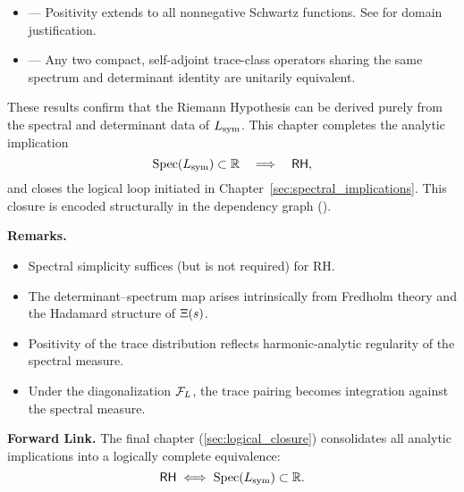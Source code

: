 \begin{itemize}
  \item {} — Positivity extends to all nonnegative Schwartz functions. See  for domain justification.

  \item {} — Any two compact, self-adjoint trace-class operators sharing the same spectrum and determinant identity are unitarily equivalent.
\end{itemize}

These results confirm that the Riemann Hypothesis can be derived purely from the spectral and determinant data of \( L_{\mathrm{sym}} \). This chapter completes the analytic implication
\[
\operatorname{Spec}(L_{\mathrm{sym}}) \subset \mathbb{R} \quad \Longrightarrow \quad \mathsf{RH},
\]
and closes the logical loop initiated in Chapter~\ref{sec:spectral_implications}. This closure is encoded structurally in the dependency graph ().

\medskip

\noindent
\textbf{Remarks.}
\begin{itemize}
  \item Spectral simplicity suffices (but is not required) for RH.
  \item The determinant–spectrum map arises intrinsically from Fredholm theory and the Hadamard structure of \( \Xi(s) \).
  \item Positivity of the trace distribution reflects harmonic-analytic regularity of the spectral measure.
  \item Under the diagonalization \( \mathcal{F}_L \), the trace pairing becomes integration against the spectral measure.
\end{itemize}

\medskip

\noindent
\textbf{Forward Link.}  
The final chapter (\cref{sec:logical_closure}) consolidates all analytic implications into a logically complete equivalence:
\[
\mathsf{RH} \iff \operatorname{Spec}(L_{\mathrm{sym}}) \subset \mathbb{R}.
\]
